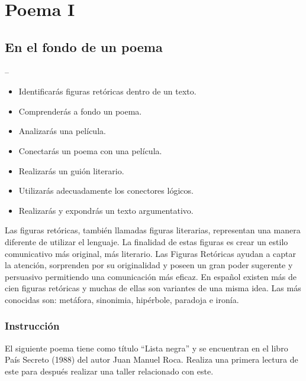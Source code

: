 \documentclass[11pt,fleqn,twocolumn]{book} %
\begin{document}
\twocolumn
{} %

\chapter{Poema I}

\section{En el fondo de un poema}

\vspace{2em}

\begin{theorem}
--
\sffamily
\begin{itemize}
\item Identificarás figuras retóricas dentro de un texto.
\item Comprenderás a fondo un poema. 
\item Analizarás una película.
\item Conectarás un poema con una película.
\item Realizarás un guión literario.
\item Utilizarás adecuadamente los conectores lógicos.
\item Realizarás y expondrás un texto argumentativo. 
\end{itemize}
\end{theorem}

\begin{definition}
Las figuras retóricas, también llamadas figuras literarias, representan una manera diferente de utilizar el lenguaje. La finalidad de estas figuras es crear un estilo comunicativo más original, más literario. Las Figuras Retóricas ayudan a captar la atención, sorprenden por su originalidad y poseen un gran poder sugerente y persuasivo permitiendo una comunicación más eficaz. En español existen más de cien figuras retóricas y muchas de ellas son variantes de una misma idea. Las más conocidas son: metáfora, sinonimia, hipérbole, paradoja e ironía. 
\end{definition}

  \vspace{1em}
\subsection*{Instrucción}
El siguiente poema tiene como título “Lista negra” y se encuentran en el libro País Secreto (1988) del autor Juan Manuel Roca. Realiza una primera lectura de este para después realizar una taller relacionado con este. \\
\end{document}
